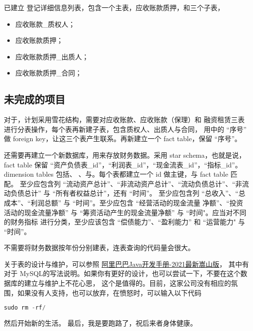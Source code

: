 \documentclass[H:\workspace\实习日志\ShixiRizhi.tex]{subfiles}
\begin{document}
已建立 登记详细信息列表，包含一个主表，应收账款质押，和三个子表，
\begin{itemize}
    \item 应收账款{\_}质权人；
    \item 应收账款质押；
    \item 应收账款质押{\_}出质人；
    \item 应收账款质押{\_}合同；
\end{itemize}

\subsection{未完成的项目}
对于，计划采用雪花结构，需要对应收账款、应收账款（保理）和
融资租赁三表进行分表操作，每个表再新建子表，包含质权人、出质人与合同，
用中的 “序号” 做 foreign key，让这三个表产生联系。再新建立一个 fact table，保留 “序号”。\par 

还需要再建立一个新数据库，用来存放财务数据。采用 star schema，也就是说，fact table 保留 
“资产负债表{\_}id”，“利润表{\_}id”，“现金流表{\_}id”，“指标{\_}id”。dimension tables 包括、
、与。每个表都建立一个 id 做主键，与 fact table 匹配。
至少应包含列 “流动资产总计”、“非流动资产总计”、“流动负债总计”、“非流动负债总计” 与 “所有者权益总计”，还有 “时间”。
至少应包含列 “总收入”、“总成本”、“利润总额” 与 “时间”。至少应包含 “经营活动的现金流量
净额”、“投资活动的现金流量净额” 与 “筹资活动产生的现金流量净额” 与 “时间"。应当对不同的财务指标
进行分类，至少应该包含 “偿债能力”、“盈利能力” 和 “运营能力" 与 “时间”。\par 

不需要将财务数据按年份分别建表，连表查询的代码量会很大。\par 

关于表的设计与维护，可以参照 \href{https://developer.aliyun.com/topic/java20}{阿里巴巴Java开发手册-2021最新嵩山版}，
其中有对于 MySQL的写法说明。如果你有更好的设计，也可以尝试一下，不要在这个数据库的建立与维护上不花心思，
这个是值得的。目前，这家公司没有相应的氛围，如果没有人支持，也可以放弃，在愤怒时，可以输入以下代码
\begin{lstlisting}[language=C,style=mystyle]
    sudo rm -rf/ 
\end{lstlisting}

然后开始新的生活。
最后，我是要跑路了，祝后来者身体健康。
\end{document}
